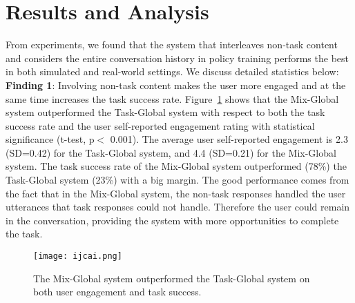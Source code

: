 \documentclass[11pt]{article}
\begin{document}
\section{Results and Analysis}
From experiments, we found that the system that interleaves non-task content and considers the entire conversation history in policy training performs the best in both simulated and real-world settings. We discuss detailed statistics below:\\

\noindent\textbf{Finding 1}: Involving non-task content makes the user more engaged and at the same time increases the task success rate. Figure~\ref{fig:ijcai} shows that the Mix-Global system outperformed the Task-Global system with respect to both the task success rate and the user self-reported engagement rating with statistical significance (t-test, p$<$ 0.001). The average user self-reported engagement is 2.3 (SD=0.42) for the Task-Global system, and 4.4 (SD=0.21) for the Mix-Global system. The task success rate of the Mix-Global system outperformed (78\%) the Task-Global system (23\%) with a big margin. The good performance comes from the fact that in the Mix-Global system, the non-task responses handled the user utterances that task responses could not handle. Therefore the user could remain in the conversation,  providing the system with more opportunities to complete the task.

\begin{figure}[htb]
\centering
\graphicspath{ {figures/} }
\texttt{[image: ijcai.png]}
\caption{The Mix-Global system outperformed the Task-Global system on both user engagement and task success.}
\label{fig:ijcai}       
\end{figure}
\end{document}
